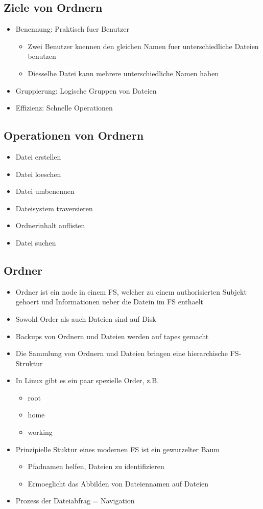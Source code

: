 \documentclass[a4paper]{scrreprt}
\begin{document}
\subsection{Ziele von Ordnern}
\begin{itemize}
	\item Benennung: Praktisch fuer Benutzer
		\begin{itemize}
			\item Zwei Benutzer koennen den gleichen Namen fuer unterschiedliche Dateien benutzen
			\item Diesselbe Datei kann mehrere unterschiedliche Namen haben
		\end{itemize}
	\item Gruppierung: Logische Gruppen von Dateien
	\item Effizienz: Schnelle Operationen
\end{itemize}

\subsection{Operationen von Ordnern}
\begin{itemize}
	\item Datei erstellen
	\item Datei loeschen
	\item Datei umbenennen
	\item Dateisystem traversieren
	\item Ordnerinhalt auflisten
	\item Datei suchen
\end{itemize}

\subsection{Ordner}
\begin{itemize}
	\item Ordner ist ein node in einem FS, welcher zu einem authorisierten Subjekt gehoert und Informationen ueber die Datein im FS enthaelt
	\item Sowohl Order als auch Dateien sind auf Disk
	\item Backups von Ordnern und Dateien werden auf tapes gemacht
	\item Die Sammlung von Ordnern und Dateien bringen eine hierarchische FS-Struktur
	\item In Linux gibt es ein paar spezielle Order, z.B.
		\begin{itemize}
			\item root
			\item home
			\item working
		\end{itemize}
	\item Prinzipielle Stuktur eines modernen FS ist ein gewurzelter Baum
		\begin{itemize}
			\item Pfadnamen helfen, Dateien zu identifizieren
			\item Ermoeglicht das Abbilden von Dateiennamen auf Dateien
		\end{itemize}
	\item Prozess der Dateiabfrag = Navigation
\end{itemize}
\end{document}
